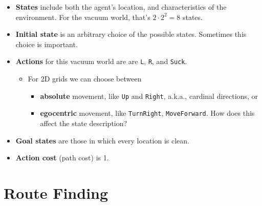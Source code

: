 \documentclass[11pt]{article}
\begin{document}
\begin{itemize}
\item \textbf{States} include both the agent's location, and characteristics of the environment.  For the vacuum world, that's \(2 \cdot 2^2 = 8\) states.
\item \textbf{Initial state} is an arbitrary choice of the possible states.  Sometimes this choice is important.
\item \textbf{Actions} for this vacuum world are are \texttt{L}, \texttt{R}, and \texttt{Suck}.

\begin{itemize}
\item For 2D grids we can choose between

\begin{itemize}
\item \textbf{absolute} movement, like \texttt{Up} and \texttt{Right}, a.k.a., cardinal directions, or
\item \textbf{egocentric} movement, like \texttt{TurnRight}, \texttt{MoveForward}.  How does this affect the state description?
\end{itemize}
\end{itemize}

\item \textbf{Goal states} are those in which every location is clean.
\item \textbf{Action cost} (path cost) is 1.
\end{itemize}
\section{Route Finding}
\label{sec:org4377b0f}
\end{document}
